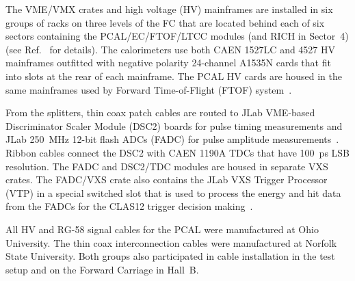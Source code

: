 The VME/VMX crates and high voltage (HV) mainframes are installed in six groups of racks on three levels of the
FC that are located behind each of six sectors containing the PCAL/EC/FTOF/LTCC modules (and RICH in
Sector~4) (see Ref.~\cite{nim:overview} for details). The calorimeters use both CAEN 1527LC and 4527 HV
mainframes outfitted with negative polarity 24-channel A1535N cards that fit into slots at the rear of each
mainframe. The PCAL HV cards are housed in the same mainframes used by Forward Time-of-Flight (FTOF)
system~\cite{nim:ftof}.  

From the splitters, thin coax patch cables are routed to JLab VME-based Discriminator Scaler Module (DSC2)
boards for pulse timing measurements and JLab 250~MHz 12-bit flash ADCs (FADC) for pulse amplitude
measurements~\cite{nim:daq}. Ribbon cables connect the DSC2 with CAEN 1190A TDCs that have 100~ps LSB
resolution. The FADC and DSC2/TDC modules are housed in separate VXS crates. The FADC/VXS crate also
contains the JLab VXS Trigger Processor (VTP) in a special switched slot that is used to process the energy and
hit data from the FADCs for the CLAS12 trigger decision making~\cite{nim:daq,nim:trig}.  

All HV and RG-58 signal cables for the PCAL were manufactured at Ohio University. The thin coax interconnection
cables were  manufactured at Norfolk State University. Both groups also participated in cable installation in the
test setup and on the Forward Carriage in Hall~B.  


